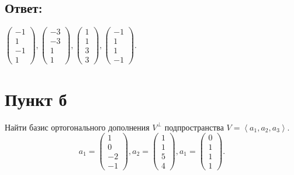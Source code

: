 \documentclass[12pt]{article}
\begin{document}
    \subsection*{Ответ:}
    $
    \begin{pmatrix}
        -1 \\ 1 \\ -1 \\ 1
    \end{pmatrix},
    \begin{pmatrix}
        -3 \\ -3 \\ 1 \\ 1
    \end{pmatrix},
    \begin{pmatrix}
        1 \\ 1 \\ 3 \\ 3
    \end{pmatrix},
    \begin{pmatrix}
        -1 \\ 1 \\ 1 \\ -1
    \end{pmatrix}
    $.

    \section*{Пункт б}
    Найти базис ортогонального дополнения $V^\perp$ подпространства $V = \left< a_1, a_2, a_3 \right>$.
    \[
        a_1 =
        \begin{pmatrix}
            1 \\ 0 \\ -2 \\ -1
        \end{pmatrix},
        a_2 =
        \begin{pmatrix}
            1 \\ 1 \\ 5 \\ 4
        \end{pmatrix},
        a_1 =
        \begin{pmatrix}
            0 \\ 1 \\ 1 \\ 1
        \end{pmatrix}.
    \]
\end{document}
